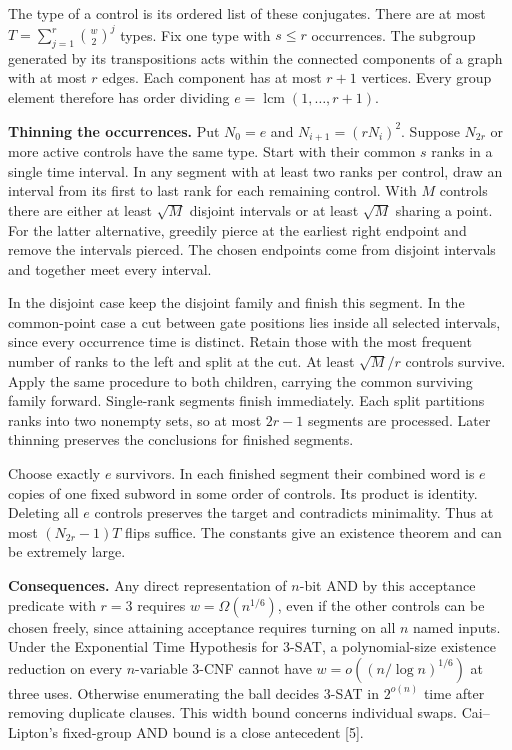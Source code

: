 \documentclass[11pt,letterpaper]{article}
\newcommand{\lab}[1]{\textbf{\color{navy}#1}\enspace}
\begin{document}
The type of a control is its ordered list of these conjugates. There are at most $T=\sum_{j=1}^{r}\binom{w}{2}^{j}$ types. Fix one type with $s\le r$ occurrences. The subgroup generated by its transpositions acts within the connected components of a graph with at most $r$ edges. Each component has at most $r+1$ vertices. Every group element therefore has order dividing $e=\operatorname{lcm}(1,\ldots,r+1)$.

\lab{Thinning the occurrences.} Put $N_0=e$ and $N_{i+1}=(rN_i)^2$. Suppose $N_{2r}$ or more active controls have the same type. Start with their common $s$ ranks in a single time interval. In any segment with at least two ranks per control, draw an interval from its first to last rank for each remaining control. With $M$ controls there are either at least $\sqrt M$ disjoint intervals or at least $\sqrt M$ sharing a point. For the latter alternative, greedily pierce at the earliest right endpoint and remove the intervals pierced. The chosen endpoints come from disjoint intervals and together meet every interval.

In the disjoint case keep the disjoint family and finish this segment. In the common-point case a cut between gate positions lies inside all selected intervals, since every occurrence time is distinct. Retain those with the most frequent number of ranks to the left and split at the cut. At least $\sqrt M/r$ controls survive. Apply the same procedure to both children, carrying the common surviving family forward. Single-rank segments finish immediately. Each split partitions ranks into two nonempty sets, so at most $2r-1$ segments are processed. Later thinning preserves the conclusions for finished segments.

Choose exactly $e$ survivors. In each finished segment their combined word is $e$ copies of one fixed subword in some order of controls. Its product is identity. Deleting all $e$ controls preserves the target and contradicts minimality. Thus at most $(N_{2r}-1)T$ flips suffice. The constants give an existence theorem and can be extremely large.

\lab{Consequences.} Any direct representation of $n$-bit AND by this acceptance predicate with $r=3$ requires $w=\Omega(n^{1/6})$, even if the other controls can be chosen freely, since attaining acceptance requires turning on all $n$ named inputs. Under the Exponential Time Hypothesis for 3-SAT, a polynomial-size existence reduction on every $n$-variable 3-CNF cannot have $w=o((n/\log n)^{1/6})$ at three uses. Otherwise enumerating the ball decides 3-SAT in $2^{o(n)}$ time after removing duplicate clauses. This width bound concerns individual swaps. Cai--Lipton's fixed-group AND bound is a close antecedent [5].
\end{document}
